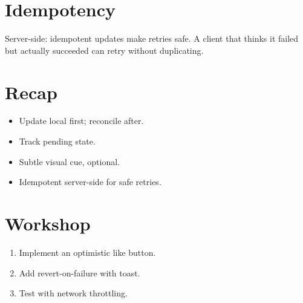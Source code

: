 \section{Idempotency}

Server-side: idempotent updates make retries safe. A
client that thinks it failed but actually succeeded can
retry without duplicating.

\section{Recap}

\begin{recap}
\begin{itemize}[leftmargin=*]
  \item Update local first; reconcile after.
  \item Track pending state.
  \item Subtle visual cue, optional.
  \item Idempotent server-side for safe retries.
\end{itemize}
\end{recap}

\section*{Workshop}

\begin{enumerate}[leftmargin=*]
  \item Implement an optimistic like button.
  \item Add revert-on-failure with toast.
  \item Test with network throttling.
\end{enumerate}
